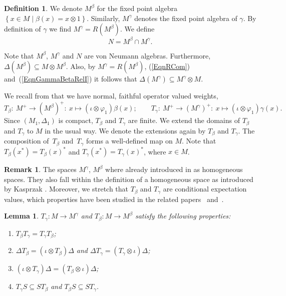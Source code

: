 \documentclass[pdftex]{sigma}
\numberwithin{equation}{section}
\newtheorem{lem}[thm]{Lemma}
\theoremstyle{definition}
\newtheorem{dfn}[thm]{Definition}
\newtheorem{rmk}[thm]{Remark}
\begin{document}
\begin{dfn}
We denote $M^\beta$ for the f\/ixed point algebra $\left\{ x \in M \mid \beta(x) = x \otimes 1 \right\}$. Similarly, $M^\gamma$ denotes the f\/ixed point algebra of $\gamma$. By def\/inition of $\gamma$ we f\/ind $M^\gamma = R(M^\beta)$.  We def\/ine
\[
N = M^\beta \cap M^\gamma.
\]
\end{dfn}
Note that $M^\beta$, $M^\gamma$ and $N$ are von Neumann algebras. Furthermore, $\Delta( M^\beta) \subseteq M \otimes M^\beta$. Also, by $M^\gamma = R(M^\beta)$, (\ref{EqnRCom}) and~(\ref{EqnGammaBetaRelI}) it follows that $\Delta(M^\gamma) \subseteq M^\gamma \otimes M$.



We recall from \cite{VaeUni} that we have normal, faithful operator valued weights,
\[
 T_\beta: \  M^+ \rightarrow (M^{\beta})^{+}: \ x \mapsto (\iota \otimes \varphi_1) \beta(x);\qquad
 T_\gamma: \ M^+ \rightarrow (M^{\gamma})^{+}: \ x \mapsto (\iota \otimes \varphi_1) \gamma(x).
\]
Since $(M_1, \Delta_1)$ is compact, $T_\beta$ and $T_\gamma$ are f\/inite. We extend the domains of $T_\beta$ and $T_\gamma$ to $M$ in the usual way. We denote the extensions again by $T_\beta$ and $T_\gamma$. The composition of~$T_\beta$ and~$T_\gamma$ forms a well-def\/ined map on $M$. Note that $T_\beta(x^\ast) = T_\beta(x)^\ast$ and $T_\gamma(x^\ast) = T_\gamma(x)^\ast$, where $x \in M$.

\begin{rmk}
The spaces $M^\gamma$, $M^\beta$ where already introduced in \cite{VaeImp} as homogeneous spaces. They also fall within the def\/inition of a homogeneous space as introduced  by Kasprzak \cite[Remark~3.3]{Kas}. Moreover, we stretch that $T_\beta$ and $T_\gamma$ are conditional expectation values, which properties have been studied in the related papers~\cite{SalmiSkalski} and~\cite{Tomatsu}.
\end{rmk}


\begin{lem}\label{LemTProperties} $T_\gamma: M \rightarrow M^\gamma$ and $T_\beta: M \rightarrow M^\beta$ satisfy the following properties:
\begin{enumerate}\itemsep=0pt
\item\label{LemTI} $T_\beta T_\gamma = T_\gamma T_\beta $;
\item\label{LemTII} $\Delta  T_\beta = (\iota \otimes T_\beta) \Delta$ and  $\Delta T_\gamma = (T_\gamma \otimes \iota)  \Delta$;
\item\label{LemTIII} $(\iota \otimes T_\gamma)  \Delta = (T_\beta \otimes \iota)  \Delta$;
\item\label{LemTIV}  $T_\gamma S \subseteq S T_\beta$ and  $T_\beta S \subseteq S T_\gamma$.
\end{enumerate}
\end{lem}
\end{document}
